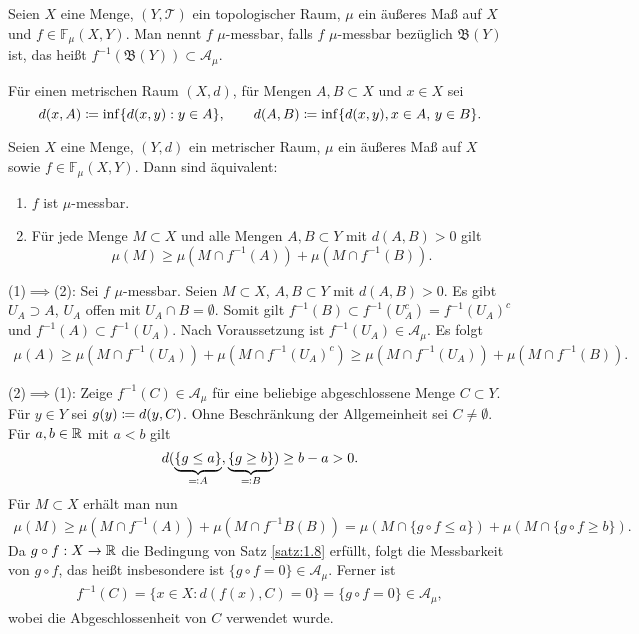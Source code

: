 \documentclass[a4paper,twoside,DIV15,BCOR12mm]{scrbook}
\newcommand{\A}{\mathcal A}
\newcommand{\borel}{\mathfrak B}
\begin{document}
\begin{definition}
Seien $X$ eine Menge, $(Y,\mathcal T)$ ein topologischer Raum, $\mu$ ein äußeres Maß auf $X$ und $f\in\mathbb F_\mu(X,Y)$. Man nennt $f$ $\mu$-messbar, falls $f$ $\mu$-messbar bezüglich $\borel(Y)$ ist, das heißt $f^{-1}(\borel(Y))\subset \A_\mu$.
\end{definition}

Für einen metrischen Raum $(X,d)$, für Mengen $A,B\subset X$ und $x\in X$ sei 
$$
d(x,A) \da \inf\{d(x,y): y\in A\},\qquad d(A,B)\da \inf\{d(x,y),x\in A,\, y\in B\}.
$$

\begin{satz}
\label{satz:2.3}
Seien $X$ eine Menge, $(Y,d)$ ein metrischer Raum, $\mu$ ein äußeres Maß auf $X$ sowie $f\in\mathbb F_\mu(X,Y)$. Dann sind äquivalent:
\begin{enumerate}
\item $f$ ist $\mu$-messbar.
\item Für jede Menge $M\subset X$ und alle Mengen $A,B\subset Y$ mit $d(A,B)>0$ gilt
\[
\mu(M) \ge \mu(M\cap f^{-1}(A)) + \mu(M \cap f^{-1}(B)).
\]
\end{enumerate}
\end{satz}

\begin{beweis}
(1)$\implies$(2): Sei $f$ $\mu$-messbar. Seien $M\subset X$, $A,B\subset Y$ mit $d(A,B)>0$. Es gibt $U_A\supset A$, $U_A$ offen mit $U_A\cap B=\emptyset$. Somit gilt $f^{-1}(B) \subset f^{-1}(U_A^c) = f^{-1}(U_A)^c$ und $f^{-1}(A)\subset f^{-1}(U_A)$. Nach Voraussetzung ist $f^{-1}(U_A)\in\A_\mu$. Es folgt
\begin{align*}
\mu(A) \ge \mu(M\cap f^{-1}(U_A)) + \mu (M\cap f^{-1}(U_A)^c)
\ge \mu(M\cap f^{-1}(U_A)) + \mu(M\cap f^{-1}(B)).
\end{align*}

(2)$\implies$(1): Zeige $f^{-1}(C) \in \A_\mu$ für eine beliebige abgeschlossene Menge $C\subset Y$. Für $y\in Y$ sei $g(y) \da d(y,C)$. Ohne Beschränkung der Allgemeinheit sei $C\ne \emptyset$. Für $a,b\in \mathbb{R}$ mit $a<b$ gilt 
\[
d(\underbrace{\{g\le a\}}_{\ad A}, \underbrace{\{g\ge b\}}_{\ad B})  \ge b - a > 0.
\]
Für $M\subset X$ erhält man nun
\begin{align*}
\mu(M) \ge \mu(M\cap f^{-1}(A)) + \mu(M\cap f^{-1}B(B)) 
= \mu(M \cap \{g\circ f\le a\}) + \mu(M\cap \{g\circ f \ge b\}).
\end{align*}
Da $g\circ f : X\to \mathbb{R}$ die Bedingung von Satz \ref{satz:1.8} erfüllt, folgt die Messbarkeit von $g\circ f$, das heißt insbesondere ist $\{g \circ f = 0\}\in \A_\mu$. Ferner ist 
\begin{align*}
f^{-1}(C) = \{x\in X: d(f(x),C)=0\} = \{g\circ f= 0\} \in \A_\mu,
\end{align*}
wobei die Abgeschlossenheit von $C$ verwendet wurde.
\end{beweis}
\end{document}
